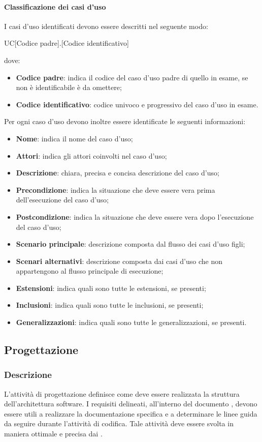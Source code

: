 \paragraph{Classificazione dei casi d'uso}
I casi d'uso identificati devono essere descritti nel seguente modo:
\begin{center}
  UC[Codice padre].[Codice identificativo]
\end{center}
dove:
\begin{itemize}
  \item\textbf{Codice padre}: indica il codice del caso d'uso padre di quello in
  esame, se non è identificabile è da omettere;
  \item\textbf{Codice identificativo}: codice univoco e progressivo del caso d'uso in esame.
\end{itemize}
Per ogni caso d'uso devono inoltre essere identificate le seguenti informazioni:
\begin{itemize}
  \item\textbf{Nome}: indica il nome del caso d'uso;
  \item\textbf{Attori}: indica gli attori coinvolti nel caso d'uso;
  \item\textbf{Descrizione}: chiara, precisa e concisa descrizione del caso
  d'uso;
  \item\textbf{Precondizione}: indica la situazione che deve essere vera prima
  dell'esecuzione del caso d'uso;
  \item\textbf{Postcondizione}: indica la situazione che deve essere vera dopo
  l'esecuzione del caso d'uso;
  \item\textbf{Scenario principale}: descrizione composta dal flusso dei casi d'uso
  figli;
  \item\textbf{Scenari alternativi}: descrizione composta dai casi d'uso che non
  appartengono al flusso principale di esecuzione;
  \item\textbf{Estensioni}: indica quali sono tutte le estensioni, se presenti;
  \item\textbf{Inclusioni}: indica quali sono tutte le inclusioni, se presenti;
  \item\textbf{Generalizzazioni}: indica quali sono tutte le generalizzazioni,
  se presenti.
\end{itemize}
\subsection{Progettazione}

\subsubsection{Descrizione}
L'attività di progettazione definisce come deve essere realizzata la struttura dell'architettura software. I requisiti delineati, all'interno del documento \textit{\AdR}, devono essere utili a realizzare la documentazione specifica e a determinare le linee guida da seguire durante l'attività di codifica.
Tale attività deve essere svolta in maniera ottimale e precisa dai \textit{\Progs}.

